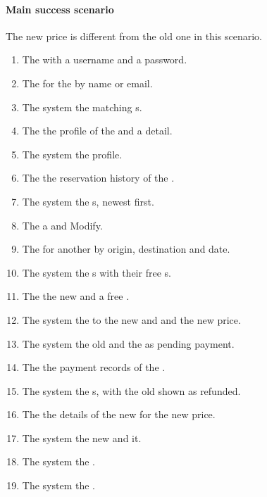 \paragraph{Main success scenario}

The new price is different from the old one in this scenario.

\begin{enumerate}
\item The   with a username and a password.
\item The   for the  by name or
  email.
\item The system  the matching s.
\item The   the profile of the  and
   a detail.
\item The system  the profile.
\item The   the reservation history of the
  .
\item The system  the s, newest first.
\item The   a  and
   Modify.
\item The   for another  by origin,
  destination and date.
\item The system  the s with their free s.
\item The   the new  and a free
  .
\item The system  the  to the new  and
   and  the new price.
\item The system  the old  and  the
   as pending payment.
\item The   the payment records of the
  .
\item The system  the s, with the old 
  shown as refunded.
\item The   the details of the new 
  for the new price.
\item The system  the new  and  it.
\item The system  the .
\item The system  the .
\end{enumerate}

